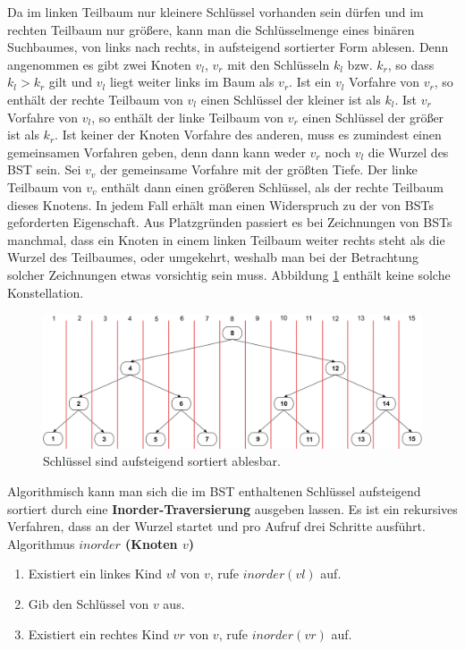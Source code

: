 \documentclass[a4paper,12pt]{article}
\begin{document}
\noindent Da im linken Teilbaum nur kleinere Schlüssel vorhanden sein dürfen und im rechten Teilbaum nur größere, kann man die Schlüsselmenge eines binären Suchbaumes, von links nach rechts, in aufsteigend sortierter Form ablesen. Denn angenommen es gibt zwei Knoten $v_l$, $v_r$ mit den Schlüsseln $k_l$ bzw. $k_r$, so dass $k_l > k_r$ gilt und $v_l$ liegt weiter links im Baum als $v_r$. Ist ein $v_l$ Vorfahre von $v_r$, so enthält der rechte Teilbaum von $v_l$ einen Schlüssel der kleiner ist als $k_l$. Ist $v_r$ Vorfahre von $v_l$, so enthält der linke Teilbaum von $v_r$ einen Schlüssel der größer ist als $k_r$. Ist keiner der Knoten Vorfahre des anderen, muss es zumindest einen gemeinsamen Vorfahren geben, denn dann kann weder $v_r$ noch $v_l$ die Wurzel des BST sein. Sei $v_v$ der gemeinsame Vorfahre mit der größten Tiefe. Der linke Teilbaum von $v_v$ enthält dann einen größeren Schlüssel, als der rechte Teilbaum dieses Knotens. In jedem Fall erhält man einen Widerspruch zu der von BSTs geforderten Eigenschaft. Aus Platzgründen passiert es bei Zeichnungen von BSTs manchmal, dass ein Knoten in einem linken Teilbaum weiter rechts steht als die Wurzel des Teilbaumes, oder umgekehrt, weshalb man bei der Betrachtung solcher Zeichnungen etwas vorsichtig sein muss. Abbildung \ref{fig:linksRechts} enthält keine solche Konstellation.  

\begin{figure}[h]
	\centering
	\includegraphics[width= 1\textwidth]{"Medien/Einleitung/linksRechts"}
	\caption{Schlüssel sind aufsteigend sortiert ablesbar. }
	\label{fig:linksRechts}
\end{figure}
\noindent Algorithmisch kann man sich die im BST enthaltenen Schlüssel aufsteigend sortiert durch eine \textbf{Inorder-Traversierung} ausgeben lassen. Es ist ein rekursives Verfahren, dass an der Wurzel startet und pro Aufruf drei Schritte ausführt.\\

Algorithmus \textbf{$\mathit{inorder}$ (Knoten $v$)}
\begin{enumerate}
	\item Existiert ein linkes Kind $\mathit{vl}$ von $v$, rufe $\mathit{inorder(vl)}$ auf. 
	\item Gib den Schlüssel von $v$ aus. 
	\item Existiert ein rechtes Kind $\mathit{vr}$ von $v$, rufe $\mathit{inorder(vr)}$ auf. 
\end{enumerate}
\end{document}
